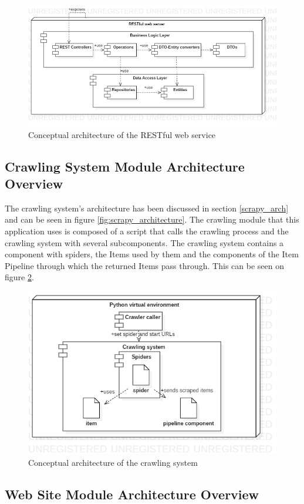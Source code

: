 \documentclass[12pt,a4paper,twoside]{report}
\begin{document}
\begin{figure}[ht]
  \centering
  \includegraphics[width=0.65\linewidth]{img/app_conceptual_architecture_rest.png}
  \caption[]{Conceptual architecture of the RESTful web service}
  \label{fig:app_conceptual_architecture_rest}
\end{figure}


\subsection{Crawling System Module Architecture Overview}

The crawling system's architecture has been discussed in section \ref{scrapy_arch} and can be seen in figure \ref{fig:scrapy_architecture}. The crawling module that this application uses is composed of a script that calls the crawling process and the crawling system with several subcomponents. The crawling system contains a component with spiders, the Items used by them and the components of the Item Pipeline through which the returned Items pass through. This can be seen on figure \ref{fig:app_conceptual_architecture_crawl}.

\begin{figure}[ht]
  \centering
  \includegraphics[width=0.65\linewidth]{img/app_conceptual_architecture_crawl.png}
  \caption[]{Conceptual architecture of the crawling system}
  \label{fig:app_conceptual_architecture_crawl}
\end{figure}


\subsection{Web Site Module Architecture Overview}
\end{document}
